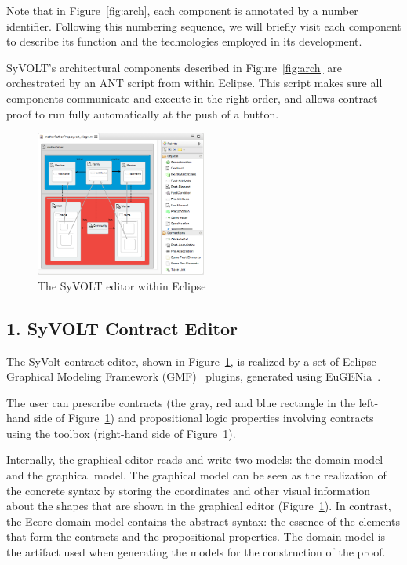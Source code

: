 Note that in Figure~\ref{fig:arch}, each component is annotated by a number
identifier. Following this numbering sequence, we will briefly visit each
component to describe its function and the technologies employed in its development.

SyVOLT's architectural components described in Figure~\ref{fig:arch} are
orchestrated by an ANT script from within Eclipse. This script makes sure all
components communicate and execute in the right order, and allows contract
proof to run fully automatically at the push of a button.

\begin{figure}
\centering
\includegraphics[width=0.5\textwidth]{figures/eclipse_frontend}
\caption{The SyVOLT editor within Eclipse}
\label{fig:eclipse_frontend}
\vspace{-.5cm}
\end{figure}


\subsection*{1. SyVOLT Contract Editor}

The SyVolt contract editor, shown in Figure~\ref{fig:eclipse_frontend}, is
realized by a set of Eclipse Graphical Modeling Framework (GMF)~\cite{gmpTool} plugins, generated using
EuGENia~\cite{Kolovos2010a}.

The user can prescribe contracts (the gray, red and blue rectangle in the
left-hand side of Figure~\ref{fig:eclipse_frontend}) and propositional logic properties involving
contracts using the toolbox (right-hand side of
Figure~\ref{fig:eclipse_frontend}).

Internally, the graphical editor reads and write two models: the domain model and the graphical model.
The graphical model can be seen as the realization of the concrete syntax by storing the coordinates and other visual information about the shapes that are shown in the graphical editor (Figure~\ref{fig:eclipse_frontend}). 
In contrast, the Ecore domain model contains the abstract syntax: the essence of
the elements that form the contracts and the propositional properties.
The domain model is the artifact used when generating the models for the construction of the proof.



